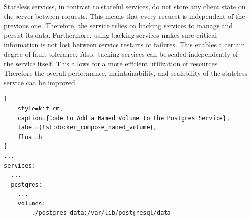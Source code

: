 Stateless services, in contrast to stateful services, do not store any client state on the server between requests.
This means that every request is independent of the previous one.
Therefore, the service relies on backing services to manage and persist its data.
Furthermore, using backing services makes sure critical information is not lost between service restarts or failures.
This enables a certain degree of fault tolerance.
Also, backing services can be scaled independently of the service itself.
This allows for a more efficient utilization of resources.
Therefore the overall performance, maintainability, and scalability of the stateless service can be improved.

\begin{lstlisting}[
    style=kit-cm,
    caption={Code to Add a Named Volume to the Postgres Service},
    label={lst:docker_compose_named_volume},
    float=h
]
...
services:
  ...
  postgres:
    ...
    volumes:
      - ./postgres-data:/var/lib/postgresql/data
\end{lstlisting}